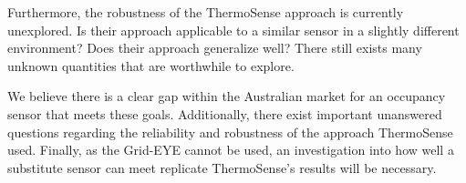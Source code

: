 \documentclass[../thesis/thesis.tex]{subfiles}
\begin{document}
Furthermore, the robustness of the ThermoSense approach is currently unexplored. Is their approach applicable to a similar sensor in a slightly different environment? Does their approach generalize well? There still exists many unknown quantities that are worthwhile to explore.

We believe there is a clear gap within the Australian market for an occupancy sensor that meets these goals. Additionally, there exist important unanswered questions regarding the reliability and robustness of the approach ThermoSense used. Finally, as the Grid-EYE cannot be used, an investigation into how well a substitute sensor can meet replicate ThermoSense's results will be necessary.

\end{document}
